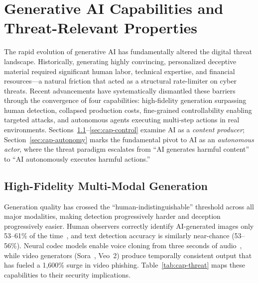 
\section{Generative AI Capabilities and Threat-Relevant Properties}
\label{sec:capabilities}

The rapid evolution of generative AI has fundamentally altered the digital threat landscape. Historically, generating highly convincing, personalized deceptive material required significant human labor, technical expertise, and financial resources---a natural friction that acted as a structural rate-limiter on cyber threats. Recent advancements have systematically dismantled these barriers through the convergence of four capabilities: high-fidelity generation surpassing human detection, collapsed production costs, fine-grained controllability enabling targeted attacks, and autonomous agents executing multi-step actions in real environments. Sections~\ref{sec:cap-fidelity}--\ref{sec:cap-control} examine AI as a \emph{content producer}; Section~\ref{sec:cap-autonomy} marks the fundamental pivot to AI as an \emph{autonomous actor}, where the threat paradigm escalates from ``AI generates harmful content'' to ``AI autonomously executes harmful actions.''


\subsection{High-Fidelity Multi-Modal Generation}
\label{sec:cap-fidelity}

Generation quality has crossed the ``human-indistinguishable'' threshold across all major modalities, making detection progressively harder and deception progressively easier. Human observers correctly identify AI-generated images only 53--61\% of the time~\cite{microsoft2025human}, and text detection accuracy is similarly near-chance (53--56\%). Neural codec models enable voice cloning from three seconds of audio~\cite{wang2023valle}, while video generators (Sora~\cite{brooks2024sora}, Veo~2) produce temporally consistent output that has fueled a 1,600\% surge in video phishing. Table~\ref{tab:cap-threat} maps these capabilities to their security implications.


